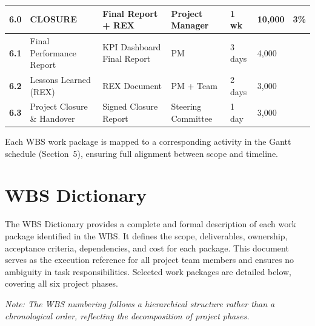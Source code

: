 \begin{longtable}{|>{\bfseries}p{1.1cm}|p{3.4cm}|p{3.1cm}|p{2.2cm}|p{1.0cm}|p{1.4cm}|p{0.8cm}|}
    \rowcolor{tableheader}
    6.0 & \textbf{CLOSURE} & Final Report + REX & Project Manager & 1 wk & 10{,}000 & 3\% \\
    \hline
    6.1 & Final Performance Report & KPI Dashboard Final Report & PM & 3 days & 4{,}000 & \\
    \hline
    6.2 & Lessons Learned (REX) & REX Document & PM + Team & 2 days & 3{,}000 & \\
    \hline
    6.3 & Project Closure \& Handover & Signed Closure Report & Steering Committee & 1 day & 3{,}000 & \\
    \hline
\end{longtable}


\noindent Each WBS work package is mapped to a corresponding activity in the Gantt schedule
(Section~5), ensuring full alignment between scope and timeline.

\section{WBS Dictionary}

The WBS Dictionary provides a complete and formal description of each work package identified in
the WBS. It defines the scope, deliverables, ownership, acceptance criteria, dependencies, and
cost for each package. This document serves as the execution reference for all project team
members and ensures no ambiguity in task responsibilities. Selected work packages are detailed
below, covering all six project phases.

\medskip
\noindent\textit{Note: The WBS numbering follows a hierarchical structure rather than a
chronological order, reflecting the decomposition of project phases.}
\medskip

\newcommand{\wbsentry}[3]{%
  \vspace{6pt}
  \noindent{\bfseries Work Package #1 -- #2}
  \vspace{4pt}

  \arrayrulecolor{tableborder}
  \renewcommand{\arraystretch}{1.55}
  \begin{tabular}{|>{\bfseries\raggedright\arraybackslash}p{3.6cm}|p{11.0cm}|}
  \hline
  #3
  \hline
  \end{tabular}
  \vspace{10pt}
}

\newcommand{\wbsrow}[2]{#1 & #2 \\ \hline}
\newcommand{\wbsrowa}[2]{#1 & #2 \\ \hline}

